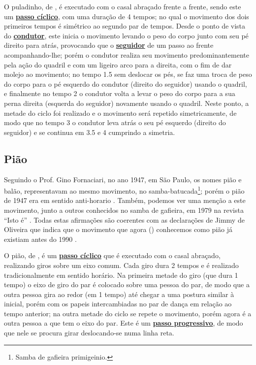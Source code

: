 O puladinho, de \AnoLivro, é executado com o casal abraçado frente a frente, sendo este um \hyperref[def:PassoCiclico]{\textbf{passo cíclico}},
com uma duração de 4 tempos; no qual o movimento dos dois primeiros tempos
é simétrico ao segundo par de tempos.
Desde o ponto de vista do  \hyperref[def:Condutor]{\textbf{condutor}}, 
este inicia o movimento levando o peso do corpo junto com seu pé direito para atrás, provocando que
o \hyperref[def:Seguidor]{\textbf{seguidor}} de um passo ao frente acompanhando-lhe;
porém o condutor realiza seu movimento predominantemente pela ação do quadril e com um ligeiro arco para a direita, 
com o fim de dar molejo ao movimento;
no tempo 1.5 sem deslocar os pés, 
se faz uma troca de peso do corpo para o pé esquerdo do condutor (direito do seguidor) usando o quadril,
e finalmente no tempo 2 o condutor volta a levar o peso 
do corpo para a sua perna direita (esquerda do seguidor) novamente usando o quadril.
Neste ponto, a metade do ciclo foi realizado e o movimento será repetido simetricamente, 
de modo que no tempo 3 o condutor leva atrás o seu pé esquerdo (direito do seguidor) e se continua em 3.5 e 4 cumprindo a simetria.

 
\subsection{Pião}

Seguindo o Prof. Gino Fornaciari, no ano 1947,  em São Paulo, os nomes pião e balão,
representavam ao mesmo movimento, no samba-batucada\footnote{Samba de gafieira primigeinio.}; 
porém o pião de 1947 era em sentido anti-horario \cite[pp. 68-72]{fornaciari1947aprender}.
Também, podemos ver uma menção a este movimento, junto a outros conhecidos no samba de gafieira, 
em 1979 na revista ``Isto é'' \cite[pp. 89]{revista1979isto}.
Todas estas afirmações são coerentes com as declarações de Jimmy de Oliveira 
que indica que o movimento que agora (\AnoLivro) conhecemos como pião 
já existiam antes do 1990 \cite{sambafunkeadoJimmyDeOliveiraPart1}.

O pião, de \AnoLivro, é um \hyperref[def:PassoCiclico]{\textbf{passo cíclico}} que é executado com o casal abraçado, 
realizando giros sobre um eixo comum.
Cada giro dura 2 tempos e é realizado tradicionalmente em sentido horário.
Na primeira metade do giro (que dura 1 tempo) o eixo de giro do par é colocado sobre uma pessoa do par, 
de modo que a outra pessoa gira ao redor (em 1 tempo) até chegar a uma postura similar à inicial, 
porém com os papeis intercambiadas no par de dança em relação ao tempo anterior;
na outra metade do ciclo se repete o movimento, porém agora é a outra pessoa a que tem o eixo do par.
Este é um \hyperref[def:PassoDeDeslocamento]{\textbf{passo progressivo}}, 
de modo que nele se procura girar deslocando-se numa linha reta.

